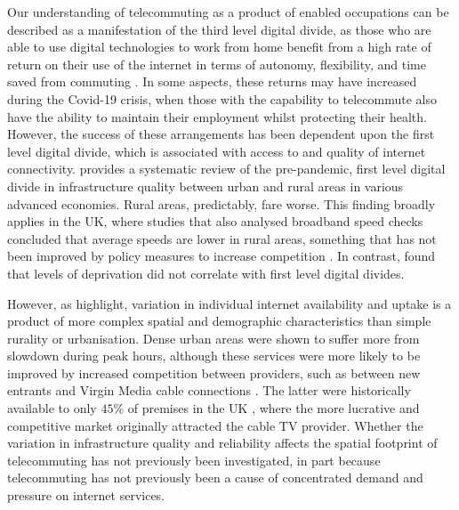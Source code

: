 \documentclass[]{interact}
\theoremstyle{plain}%
\theoremstyle{definition}
\theoremstyle{remark}
\begin{document}
Our understanding of telecommuting as a product of enabled occupations
can be described as a manifestation of the third level digital divide,
as those who are able to use digital technologies to work from home
benefit from a high rate of return on their use of the internet in terms
of autonomy, flexibility, and time saved from commuting
\citep{peters2004employees, siha2006telecommuting, singh2013modeling}.
In some aspects, these returns may have increased during the Covid-19
crisis, when those with the capability to telecommute also have the
ability to maintain their employment whilst protecting their health.
However, the success of these arrangements has been dependent upon the
first level digital divide, which is associated with access to and
quality of internet connectivity. \citet{SALEMINK2017360} provides a
systematic review of the pre-pandemic, first level digital divide in
infrastructure quality between urban and rural areas in various advanced
economies. Rural areas, predictably, fare worse. This finding broadly
applies in the UK, where studies that also analysed broadband speed
checks concluded that average speeds are lower in rural areas, something
that has not been improved by policy measures to increase competition
\citep{riddlesden2014broadband, nardotto2015unbundling}. In contrast,
\citet{riddlesden2014broadband} found that levels of deprivation did not
correlate with first level digital divides.

However, as \citet{blank2018local} highlight, variation in individual
internet availability and uptake is a product of more complex spatial
and demographic characteristics than simple rurality or urbanisation.
Dense urban areas were shown to suffer more from slowdown during peak
hours, although these services were more likely to be improved by
increased competition between providers, such as between new entrants
and Virgin Media cable connections
\citep{riddlesden2014broadband, nardotto2015unbundling}. The latter were
historically available to only \(45\)\% of premises in the UK
\citep{ofcom2016}, where the more lucrative and competitive market
originally attracted the cable TV provider. Whether the variation in
infrastructure quality and reliability affects the spatial footprint of
telecommuting has not previously been investigated, in part because
telecommuting has not previously been a cause of concentrated demand and
pressure on internet services.
\end{document}
